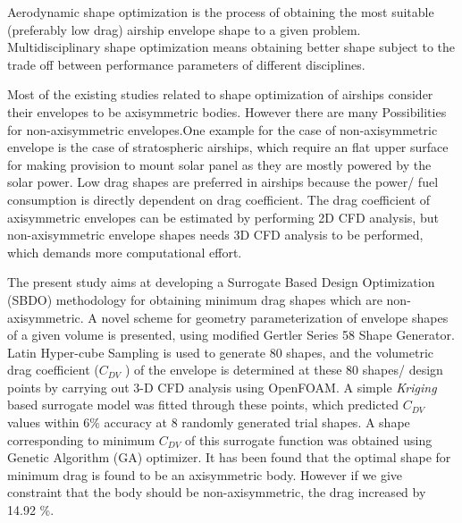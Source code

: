 \begin{Abstract}
	
Aerodynamic shape optimization is the process of obtaining the most suitable (preferably low drag) airship envelope shape to a given problem. Multidisciplinary shape optimization means obtaining better shape subject to the trade off between performance parameters of different disciplines.

Most of the existing studies related to shape optimization of airships consider their envelopes to be axisymmetric bodies. However there are many Possibilities for non-axisymmetric envelopes.One example for the case of non-axisymmetric envelope is the case of stratospheric airships, which require an flat upper surface for making provision to mount solar panel as they are mostly powered by the solar power. Low drag shapes are preferred in airships because the power/ fuel consumption is directly dependent on drag coefficient.  The drag coefficient of axisymmetric envelopes can be estimated by performing 2D CFD analysis, but non-axisymmetric envelope shapes needs 3D CFD analysis to be performed, which demands more computational effort. 

The present study aims at developing a Surrogate Based Design Optimization (SBDO) methodology for obtaining minimum drag shapes which are non-axisymmetric. A novel scheme for geometry parameterization of envelope shapes of a given volume is presented, using modified Gertler Series 58 Shape Generator. Latin Hyper-cube Sampling is used to generate 80 shapes, and the volumetric drag coefficient ($ C_{DV} $ ) of the envelope is determined at these 80 shapes/ design points by carrying out 3-D CFD analysis using OpenFOAM\textsuperscript{\textregistered}. A simple \textit{Kriging} based surrogate model was fitted through these points, which predicted  $ C _{DV} $  values within $ 6 \% $ accuracy at 8 randomly generated trial shapes. A shape corresponding to minimum $ C _{DV} $ of this surrogate function was obtained using Genetic Algorithm (GA) optimizer. It has been found that the optimal shape for minimum drag is found to be an axisymmetric body. However if we give constraint that the body should be non-axisymmetric, the drag increased by 14.92 \%.
\end{Abstract}
